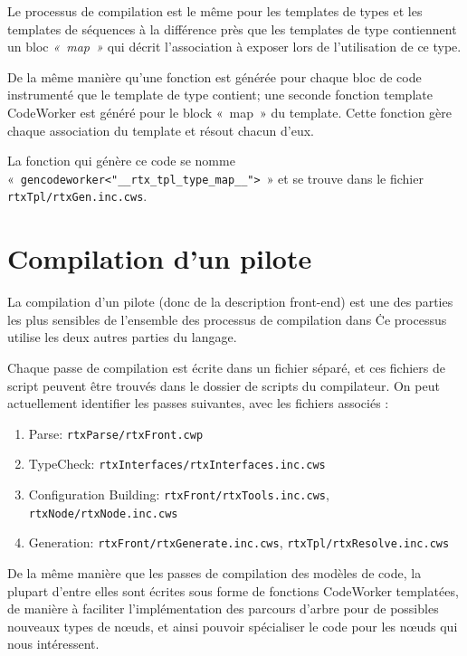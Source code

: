 \documentclass[french]{rtxreport}
\begin{document}

Le processus de compilation est le même pour les templates de types et les
templates de séquences à la différence près que les templates de type
contiennent un bloc \emph{«~map~»} qui décrit l'association à exposer lors de
l'utilisation de ce type.

De la même manière qu'une fonction est générée pour chaque bloc de code
instrumenté que le template de type contient; une seconde fonction template
CodeWorker est généré pour le block «~map~» du template. Cette fonction gère
chaque association du template et résout chacun d'eux.

La fonction qui génère ce code se nomme «~\texttt{gencodeworker<"\_\_rtx\_tpl\_type\_map\_\_">}~»
et se trouve dans le fichier \texttt{rtxTpl/rtxGen.inc.cws}.

\section{Compilation d'un pilote}

La compilation d'un pilote (donc de la description front-end) est une des
parties les plus sensibles de l'ensemble des processus de compilation dans
\rtx\. Ce processus utilise les deux autres parties du langage.

Chaque passe de compilation est écrite dans un fichier séparé, et ces fichiers
de script peuvent être trouvés dans le dossier de scripts du compilateur. On
peut actuellement identifier les passes suivantes, avec les fichiers associés :
\begin{enumerate}
    \item Parse: \texttt{rtxParse/rtxFront.cwp}
    \item TypeCheck: \texttt{rtxInterfaces/rtxInterfaces.inc.cws}
    \item Configuration Building: \texttt{rtxFront/rtxTools.inc.cws},
                                  \texttt{rtxNode/rtxNode.inc.cws}
    \item Generation: \texttt{rtxFront/rtxGenerate.inc.cws},
                      \texttt{rtxTpl/rtxResolve.inc.cws}
\end{enumerate}

De la même manière que les passes de compilation des modèles de code, la
plupart d'entre elles sont écrites sous forme de fonctions CodeWorker
templatées, de manière à faciliter l'implémentation des parcours d'arbre
pour de possibles nouveaux types de nœuds, et ainsi pouvoir spécialiser
le code pour les nœuds qui nous intéressent.
\end{document}
